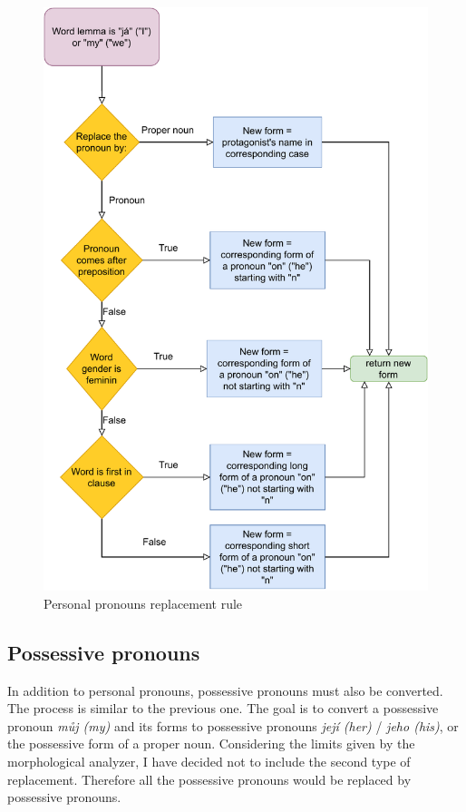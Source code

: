 \begin{figure}[!htbp]
\includegraphics[width=\textwidth]{data/Icher-Perspron-Rule.pdf}
\caption{Personal pronouns replacement rule}
\label{fig:icher-perspron-rule}
\end{figure}

\subsection{Possessive pronouns}

In addition to personal pronouns, possessive pronouns must also be converted. The process is similar to the previous one. The goal is to convert a possessive pronoun \emph{můj (my)} and its forms to possessive pronouns \emph{její (her)} / \emph{jeho (his)}, or the possessive form of a proper noun. Considering the limits given by the morphological analyzer, I have decided not to include the second type of replacement. Therefore all the possessive pronouns would be replaced by possessive pronouns.

